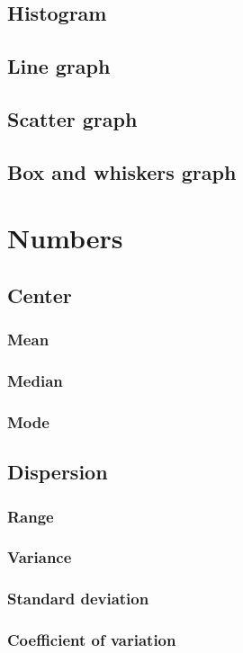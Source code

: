 \documentclass{report}
\begin{document}
	\subsection{Histogram}
	\subsection{Line graph}
	\subsection{Scatter graph}
	\subsection{Box and whiskers graph}
	\section{Numbers}
	\subsection{Center}
	\subsubsection{Mean}
	\subsubsection{Median}
	\subsubsection{Mode}
	\subsection{Dispersion}
	\subsubsection{Range}
	\subsubsection{Variance}
	\subsubsection{Standard deviation}
	\subsubsection{Coefficient of variation}
\end{document}
